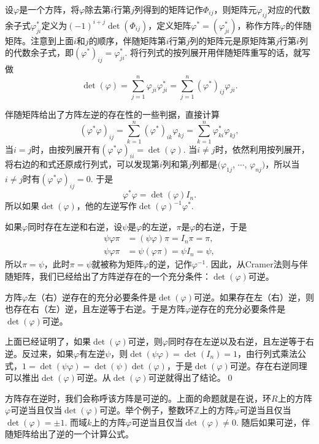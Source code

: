 \para 设$\varphi$是一个方阵，将$\varphi$除去第$i$行第$j$列得到的矩阵记作$\Phi_{ij}$，则矩阵元$\varphi_{ij}$对应的代数余子式$\varphi_{ji}^*$定义为$(-1)^{i+j}\det(\Phi_{ij})$，定义矩阵$\varphi^*=(\varphi_{ji}^*)$，称作方阵$\varphi$的伴随矩阵。注意到上面$i$和$j$的顺序，伴随矩阵第$i$行第$j$列的矩阵元是原矩阵第$j$行第$i$列的代数余子式，即$(\varphi^*)_{ij}=\varphi_{ji}^*$. 将行列式的按列展开用伴随矩阵重写的话，就写做
\[
	\det(\varphi)=\sum_{j=1}^n\varphi_{ji}\varphi_{ji}^*=\sum_{j=1}^n(\varphi^*)_{ij}\varphi_{ji}.
\]

伴随矩阵给出了方阵左逆的存在性的一些判据，直接计算
\[
	(\varphi^*\varphi)_{ij}=\sum_{k=1}^n(\varphi^*)_{ik}\varphi_{kj}=\sum_{k=1}^n\varphi^*_{ki}\varphi_{kj},
\]
当$i=j$时，由按列展开有$(\varphi^*\varphi)_{ii}=\det(\varphi)$. 当$i\neq j$时，依然利用按列展开，将右边的和式还原成行列式，可以发现第$i$列和第$j$列都是$(\varphi_{1j}$, $\cdots$, $\varphi_{nj})$，所以当$i\neq j$时有$(\varphi^*\varphi)_{ij}=0$. 于是
\[
	\varphi^*\varphi=\det(\varphi)I_n.
\]
所以如果$\det(\varphi)$，他的左逆写作$\det(\varphi)^{-1}\varphi^*$.

\para 如果$\varphi$同时存在左逆和右逆，设$\psi$是$\varphi$的左逆，$\pi$是$\varphi$的右逆，于是
\[
\begin{aligned}
	\psi\varphi\pi&=(\psi\varphi)\pi=I_n \pi=\pi,\\
	\psi\varphi\pi&=\psi(\varphi\pi)=\psi I_n=\psi,
\end{aligned}
\]
所以$\pi=\psi$，此时$\pi=\psi$就被称为矩阵$\varphi$的逆，记作$\varphi^{-1}$. 因此，从Cramer法则与伴随矩阵，我们已经给出了方阵逆存在的一个充分条件：$\det(\varphi)$可逆。

\pro 方阵$\varphi$左（右）逆存在的充分必要条件是$\det(\varphi)$可逆。如果存在左（右）逆，则也存在右（左）逆，且左逆等于右逆。于是方阵$\varphi$逆存在的充分必要条件是$\det(\varphi)$可逆。

\proof 上面已经证明了，如果$\det(\varphi)$可逆，则$\varphi$同时存在左逆以及右逆，且左逆等于右逆。反过来，如果$\varphi$有左逆$\psi$，则$\det(\psi\varphi)=\det(I_n)=1$，由行列式乘法公式，$1=\det(\psi\varphi)=\det(\psi)\det(\varphi)$，于是$\det(\varphi)$可逆。存在右逆同理可以推出$\det(\varphi)$可逆。从$\det(\varphi)$可逆就得出了结论。\qed

方阵存在逆时，我们会称呼该方阵是可逆的。上面的命题就是在说，环$R$上的方阵$\varphi$可逆当且仅当$\det(\varphi)$可逆。举个例子，整数环$\mathbb{Z}$上的方阵$\varphi$可逆当且仅当$\det(\varphi)=\pm 1$. 而域$k$上的方阵$\varphi$可逆当且仅当$\det(\varphi)\neq 0$. 随后如果可逆，伴随矩阵给出了逆的一个计算公式。

